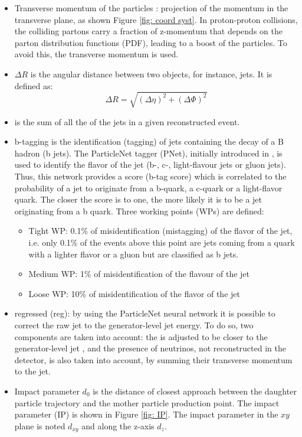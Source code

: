 \begin{itemize}
    \item Transverse momentum of the particles \pt: projection of the momentum in the transverse plane, as shown Figure \ref{fig: coord syst}. In proton-proton collisions, the colliding partons carry a fraction of z-momentum that depends on the parton distribution functions (PDF), leading to a boost of the particles. To avoid this, the transverse momentum is used. 
    \item $\Delta R$ is the angular distance between two objects, for instance, jets. It is defined as:
    \begin{equation}
        \Delta R = \sqrt{(\Delta \eta)^2 + (\Delta \Phi)^2 }
    \end{equation}
    \item \Ht is the sum of all the \pt of the jets in a given reconstructed event.
    \item b-tagging is the identification (tagging) of jets containing the decay of a B hadron (b jets). The ParticleNet tagger (PNet), initially introduced in \cite{PNet},
    is used to identify the flavor of the jet (b-, c-, light-flavour jets or gluon jets). Thus, this network provides a score (b-tag score) which is correlated to the probability of a jet to originate from a b-quark, a c-quark or a light-flavor quark. The closer the score is to one, the more likely it is to be a jet originating from a b quark. Three working points (WPs) are defined:
    \begin{itemize}
        \item Tight WP: 0.1\% of misidentification (mistagging) of the flavor of the jet, i.e. only 0.1\% of the events above this point are jets coming from a quark with a lighter flavor or a gluon but are classified as b jets.
        \item Medium WP: 1\% of misidentification of the flavour of the jet
        \item Loose WP: 10\% of misidentification of the flavor of the jet
    \end{itemize}
    \item \pt regressed (\pt reg): by using the ParticleNet neural network it is possible to correct the raw jet \pt to the generator-level jet energy. To do so, two components are taken into account: the \pt is adjusted to be closer to the generator-level jet \pt, and the presence of neutrinos, not reconstructed in the detector, is also taken into account, by summing their transverse momentum to the jet.
    \item Impact parameter $d_0$ is the distance of closest approach between the daughter particle trajectory and the mother particle production point. The impact parameter (IP) is shown in Figure \ref{fig: IP}. The impact parameter in the $xy$ plane is noted $d_{xy}$ and along the z-axis $d_z$.
\end{itemize}


